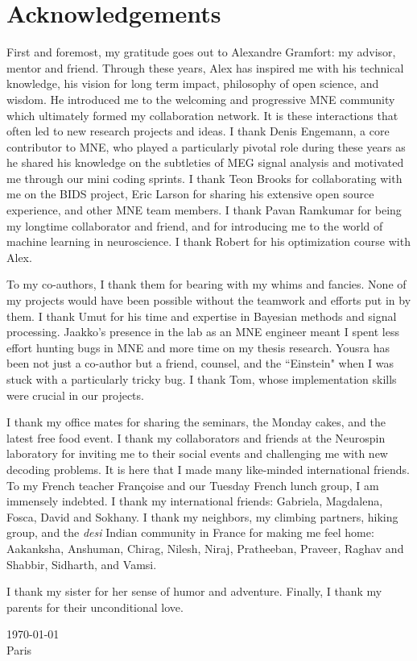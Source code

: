 \chapter*{Acknowledgements}
First and foremost, my gratitude goes out to Alexandre Gramfort: my advisor, mentor and friend. Through these years, Alex has inspired me with his technical knowledge, his vision for long term impact, philosophy of open science, and wisdom. He introduced me to the welcoming and progressive MNE community which ultimately formed my collaboration network. It is these interactions that often led to new research projects and ideas. I thank Denis Engemann, a core contributor to MNE, who played a particularly pivotal role during these years as he shared his knowledge on the subtleties of MEG signal analysis and motivated me through our mini coding sprints. I thank Teon Brooks for collaborating with me on the BIDS project, Eric Larson for sharing his extensive open source experience, and other MNE team members. I thank Pavan Ramkumar for being my longtime collaborator and friend, and for introducing me to the world of machine learning in neuroscience. I thank Robert for his optimization course with Alex.

To my co-authors, I thank them for bearing with my whims and fancies. None of my projects would have been possible without the teamwork and efforts put in by them. I thank Umut for his time and expertise in Bayesian methods and signal processing. Jaakko's presence in the lab as an MNE engineer meant I spent less effort hunting bugs in MNE and more time on my thesis research. Yousra has been not just a co-author but a friend, counsel, and the ``Einstein" when I was stuck with a particularly tricky bug. I thank Tom, whose implementation skills were crucial in our projects. 

I thank my office mates for sharing the seminars, the Monday cakes, and the latest free food event. I thank my collaborators and friends at the Neurospin laboratory for inviting me to their social events and challenging me with new decoding problems. It is here that I made many like-minded international friends. To my French teacher Françoise and our Tuesday French lunch group, I am immensely indebted. I thank my international friends: Gabriela, Magdalena, Fosca, David and Sokhany. I thank my neighbors, my climbing partners, hiking group, and the \textit{desi} Indian community in France for making me feel home: Aakanksha, Anshuman, Chirag, Nilesh, Niraj, Pratheeban, Praveer, Raghav and Shabbir, Sidharth, and Vamsi.

I thank my sister for her sense of humor and adventure. Finally, I thank my parents for their unconditional love.

\today \\
Paris
